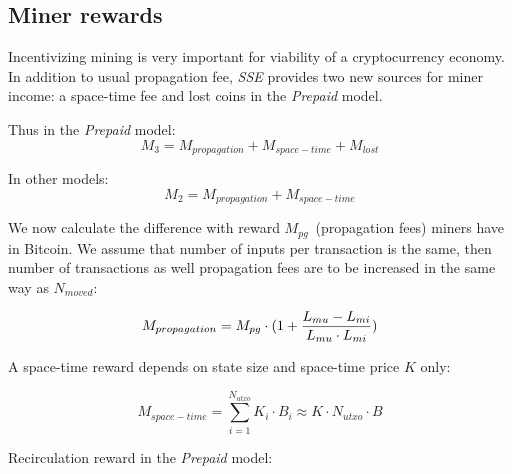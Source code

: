 \documentclass[]{llncs}   %
\newcommand{\authnote}[2]{\marginpar{\parbox{\marginparwidth}{\tiny %
  \textsf{#1 {\textcolor{blue}{notes: #2}}}}}%
  \textcolor{blue}{\textbf{\dag}}}
\newcommand{\authnote}[2]{
  \textsf{#1 \textcolor{blue}{: #2}}}
\newcommand{\authnote}[2]{}
\newcommand{\dnote}[1]{{\authnote{\textcolor{red}{Dima notes}}{#1}}}
\newcommand{\esse}{\textit{SSE}}
\newcommand{\ignore}[1]{} %
\begin{document}
\subsection{Miner rewards}
\label{minerrew}
Incentivizing mining is very important for viability of a cryptocurrency economy. 
In addition to usual propagation fee, \esse{} provides two new sources for miner income: a space-time fee and lost coins in the \textit{Prepaid} model.

Thus in the \textit{Prepaid} model:
\begin{equation}
M_{3} = M_{propagation} + M_{space-time} + M_{lost}
\end{equation}

In other models:
\begin{equation}
M_{2} = M_{propagation} + M_{space-time}
\end{equation}

We now calculate the difference with reward $M_{pg}$~(propagation fees) miners have in Bitcoin. We assume that number of inputs per transaction is the same, then number of transactions as well propagation fees are to be increased in the same way as $N_{moved}$:

\begin{equation}
M_{propagation} = M_{pg} \cdot(1 + {{L_{mu}-L_{mi}} \over {L_{mu} \cdot L_{mi}}})
\end{equation}



\ignore{
  In Section \ref{sec:flow} we have noticed, that \esse{} users have an incentive to actively use their coins and propagation reward is correlated with space-time reward:

  \begin{equation}
    M_{propagation} = r_{flow} \cdot M_{space-time} + M_{pg}
  \end{equation}

  where $C$ is non-negative constant. 
}

A space-time reward depends on state size and space-time price $K$ only:

\begin{equation}
M_{space-time} = \sum_{i=1}^{N_{utxo}} K_i \cdot B_i \approx K \cdot N_{utxo} \cdot B
\end{equation}

Recirculation reward in the \textit{Prepaid} model:

\end{document}
